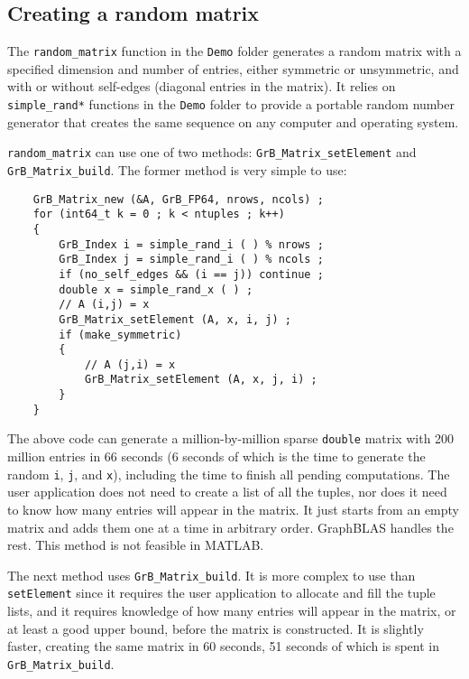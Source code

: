 \documentclass[12pt]{article}
\begin{document}
\subsection{Creating a random matrix}
\label{random}

The \verb'random_matrix' function in the \verb'Demo' folder generates a random
matrix with a specified dimension and number of entries, either symmetric or
unsymmetric, and with or without self-edges (diagonal entries in the matrix).
It relies on \verb'simple_rand*' functions in the \verb'Demo' folder to provide
a portable random number generator that creates the same sequence on any
computer and operating system.

\verb'random_matrix' can use one of two methods: \verb'GrB_Matrix_setElement'
and \verb'GrB_Matrix_build'.  The former method is very simple to use:

    {\footnotesize
    \begin{verbatim}
    GrB_Matrix_new (&A, GrB_FP64, nrows, ncols) ;
    for (int64_t k = 0 ; k < ntuples ; k++)
    {
        GrB_Index i = simple_rand_i ( ) % nrows ;
        GrB_Index j = simple_rand_i ( ) % ncols ;
        if (no_self_edges && (i == j)) continue ;
        double x = simple_rand_x ( ) ;
        // A (i,j) = x
        GrB_Matrix_setElement (A, x, i, j) ;
        if (make_symmetric)
        {
            // A (j,i) = x
            GrB_Matrix_setElement (A, x, j, i) ;
        }
    } \end{verbatim}}

The above code can generate a million-by-million sparse \verb'double' matrix
with 200 million entries in 66 seconds (6 seconds of which is the time to
generate the random \verb'i', \verb'j', and \verb'x'), including the time
to finish all pending computations.  The user application does not need to
create a list of all the tuples, nor does it need to know how many entries will
appear in the matrix.  It just starts from an empty matrix and adds them one at
a time in arbitrary order.  GraphBLAS handles the rest.  This method is not
feasible in MATLAB.

The next method uses \verb'GrB_Matrix_build'.  It is more complex to use than
\verb'setElement' since it requires the user application to allocate and fill
the tuple lists, and it requires knowledge of how many entries will appear in
the matrix, or at least a good upper bound, before the matrix is constructed.
It is slightly faster, creating the same matrix in 60 seconds, 51 seconds
of which is spent in \verb'GrB_Matrix_build'.
\end{document}
